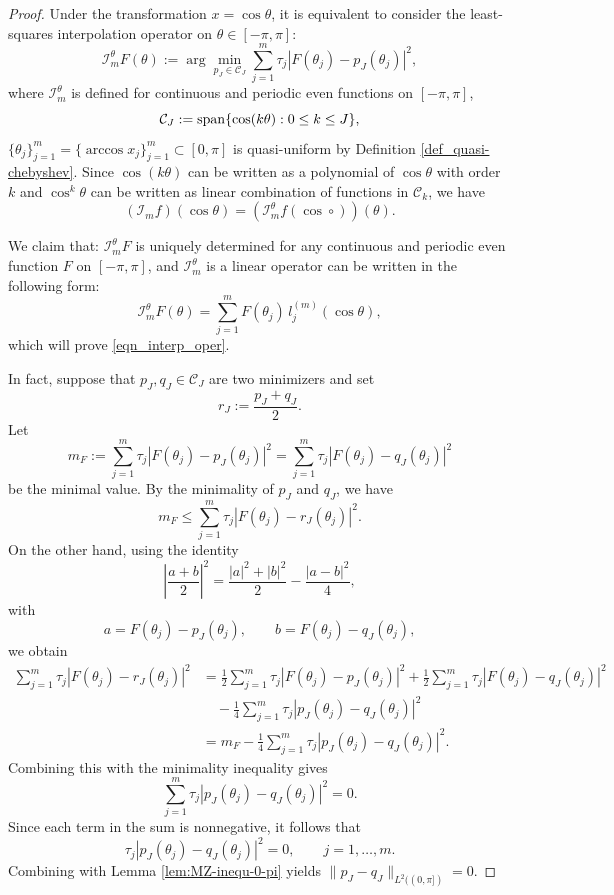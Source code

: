 \documentclass{article}
\numberwithin{equation}{section}
\begin{document}
\begin{proof}
    Under the transformation $x = \cos \theta$, it is equivalent to consider the least-squares interpolation operator on $\theta\in[-\pi,\pi]$: 
    \begin{equation}
        \mathcal I_m^\theta F(\theta) := \arg\min_{p_J\in \mathcal{C}_J} \sum_{j=1}^m \tau_j |F(\theta_j) - p_J(\theta_j)|^2,
    \end{equation}
    where $\mathcal I_m^\theta$ is defined for continuous and periodic even functions on $[-\pi,\pi]$, 
    $$\mathcal{C}_J:={\rm span}\{\cos(k\theta):0\leq k\leq J\},$$ 
    $\{\theta_j\}_{j=1}^m = \{\arccos x_j\}_{j=1}^m \subset [0,\pi]$ is quasi-uniform by Definition \ref{def_quasi-chebyshev}. Since $\cos(k\theta)$ can be written as a polynomial of $\cos\theta$ with order $k$ and $\cos^k\theta$ can be written as linear combination of functions in $\mathcal{C}_k$, we have
    $$ (\mathcal I_m f)(\cos\theta) = (\mathcal I_m^\theta f(\cos\circ))(\theta).$$

    We claim that: $\mathcal I_m^\theta F$ is uniquely determined for any continuous and periodic even function $F$ on $[-\pi,\pi]$, and 
    $\mathcal I_m^\theta$ is a linear operator can be written in the following form: 
    \begin{equation}
        \mathcal I_m^\theta F(\theta) = \sum_{j=1}^m F(\theta_j)\,l_j^{(m)}(\cos\theta),
    \end{equation}
    which will prove \eqref{eqn_interp_oper}.

    In fact, suppose that \(p_J,q_J\in \mathcal C_J\) are two minimizers and set
    \[
        r_J:=\frac{p_J+q_J}{2}.
    \]
    Let
    \[
    m_F:=\sum_{j=1}^m \tau_j |F(\theta_j)-p_J(\theta_j)|^2
     =\sum_{j=1}^m \tau_j |F(\theta_j)-q_J(\theta_j)|^2
    \]
    be the minimal value. By the minimality of \(p_J\) and \(q_J\), we have
    \[
    m_F\le \sum_{j=1}^m \tau_j |F(\theta_j)-r_J(\theta_j)|^2 .
    \]
    On the other hand, using the identity
    \[
    \left|\frac{a+b}{2}\right|^2
    =
    \frac{|a|^2+|b|^2}{2}
    -\frac{|a-b|^2}{4},
    \]
    with
    \[
    a=F(\theta_j)-p_J(\theta_j),
    \qquad
    b=F(\theta_j)-q_J(\theta_j),
    \]
    we obtain
    \[
    \begin{aligned}
    \sum_{j=1}^m \tau_j |F(\theta_j)-r_J(\theta_j)|^2
    &=
    \frac12 \sum_{j=1}^m \tau_j |F(\theta_j)-p_J(\theta_j)|^2
    +\frac12 \sum_{j=1}^m \tau_j |F(\theta_j)-q_J(\theta_j)|^2 \\
    &\quad
    -\frac14 \sum_{j=1}^m \tau_j |p_J(\theta_j)-q_J(\theta_j)|^2 \\
    &=
    m_F-\frac14 \sum_{j=1}^m \tau_j |p_J(\theta_j)-q_J(\theta_j)|^2 .
    \end{aligned}
    \]
    Combining this with the minimality inequality gives
    \[
    \sum_{j=1}^m \tau_j |p_J(\theta_j)-q_J(\theta_j)|^2=0.
    \]
    Since each term in the sum is nonnegative, it follows that
    \[
    \tau_j |p_J(\theta_j)-q_J(\theta_j)|^2=0,
    \qquad j=1,\ldots,m.
    \]
    Combining with Lemma \ref{lem:MZ-inequ-0-pi} yields $\|p_J-q_J\|_{L^2((0,\pi])}=0$. 


\end{proof}
\end{document}
